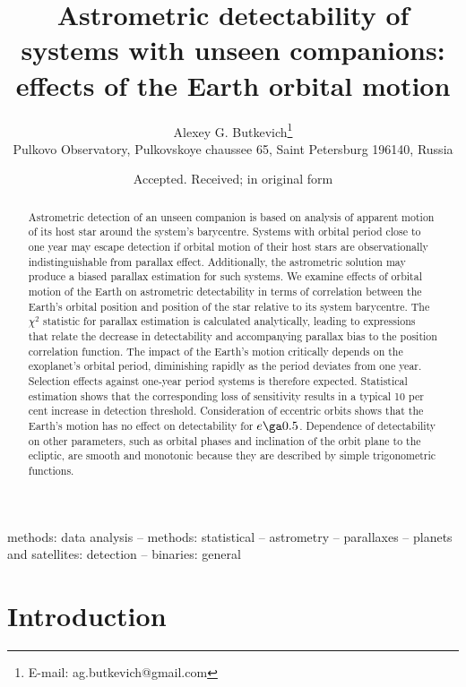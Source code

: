 \documentclass[fleqn,usenatbib,useAMS,usedcolumn]{mnras}
\title[Astrometric detectability of unseen companions]{Astrometric detectability of systems with unseen companions: effects of the Earth orbital motion}
\author[A. G. Butkevich]{
Alexey G. Butkevich\thanks{E-mail: ag.butkevich@gmail.com}
\\
Pulkovo Observatory, Pulkovskoye chaussee 65, Saint Petersburg 196140, Russia
}
\date{Accepted. Received; in original form}
\begin{document}
\label{firstpage}
\pagerange{\pageref{firstpage}--\pageref{lastpage}}
\maketitle

\begin{abstract}
Astrometric detection of an unseen companion is based on analysis of apparent motion of its host star around the system's barycentre. Systems with orbital period close to one year may escape detection if orbital motion of their host stars are observationally indistinguishable from parallax effect. Additionally, the astrometric solution may produce a biased parallax estimation for such systems. We examine effects of orbital motion of the Earth on astrometric detectability in terms of correlation between the Earth's orbital position and position of the star relative to its system barycentre. The $\chi^2$ statistic for parallax estimation is calculated analytically, leading to expressions that relate the decrease in detectability and accompanying parallax bias to the position correlation function. The impact of the Earth's motion critically depends on the exoplanet's orbital period, diminishing rapidly as the period deviates from one year. Selection effects against one-year period systems is therefore expected. Statistical estimation shows that the corresponding loss of sensitivity results in a typical 10 per cent increase in detection threshold. Consideration of eccentric orbits shows that the Earth's motion has no effect on detectability for $e\ga0.5$. Dependence of detectability on other parameters, such as orbital phases and inclination of the orbit plane to the ecliptic, are smooth and monotonic because they are described by simple trigonometric functions.
\end{abstract}

\begin{keywords}
methods: data analysis -- methods: statistical -- astrometry -- parallaxes -- planets and satellites: detection -- binaries: general
\end{keywords}



\section{Introduction}
\end{document}
